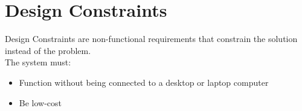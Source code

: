 
\section{Design Constraints}
Design Constraints are non-functional requirements that constrain the solution instead of the problem. \\
The system must:
\begin{itemize}
	\item Function without being connected to a desktop or laptop computer
	\item Be low-cost
\end{itemize}

